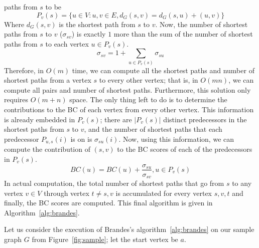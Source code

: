 paths from $s$ to be
%
\begin{equation}
P_v(s)=\{u\in{}V:{u,v}\in{}E,d_G(s,v)=d_G(s,u)+(u,v)\}
\end{equation}
%
Where $d_G(s,v)$ is the shortest path from $s$ to $v$.
%
Now, the number of shortest paths from $s$ to $v$ ($\sigma{}_{sv}$) is exactly
$1$ more than the sum of the number of shortest paths from $s$ to each vertex
$u\in{}P_v(s)$. 
%
\begin{equation}
\sigma{}_{sv} = 1 + \sum_{u\in{}P_v(s)}\sigma{}_{su}
\end{equation}
%
Therefore, in $O(m)$ time, we can compute all the shortest paths and number of
shortest paths from a vertex $s$ to every other vertex; that is, in $O(mn)$,
we can compute all pairs and number of shortest paths.
%
Furthermore, this solution only requires $O(m+n)$ space.
%
The only thing left to do is to determine the contributions to the BC of each
vertex from every other vertex.
%
This information is already embedded in $P_v(s)$; there are
$\lvert{}P_v(s)\rvert{}$ distinct predecessors in the shortest paths from $s$
to $v$, and the number of shortest paths that each predecessor $P_{u,s}(i)$
is on is $\sigma{}_{su}(i)$. 
%
Now, using this information, we can compute the contribution of $(s,v)$ to 
the BC scores of each of the predecessors in $P_v(s)$.
%
\begin{equation}
BC(u) = BC(u) + \frac{\sigma{}_{su}}{\sigma{}_{sv}}, u\in{}P_v(s)
\end{equation}
%
In actual computation, the total number of shortest paths that go from $s$ to 
any vertex $v\in{}V$ through vertex $t\ne{}s,v$ is accumulated for every vertex
$s,v,t$ and finally, the BC scores are computed.
%
This final algorithm is given in Algorithm~\ref{alg:brandes}.

%
Let us consider the execution of Brandes's algorithm~\ref{alg:brandes} on our
sample graph $G$ from Figure~\ref{fig:sample}; let the start vertex be $a$.

